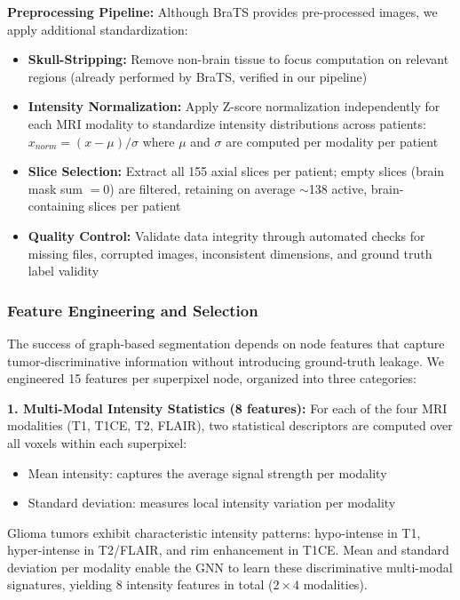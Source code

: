 \textbf{Preprocessing Pipeline:} Although BraTS provides pre-processed images, we apply additional standardization:

\begin{itemize}
    \item \textbf{Skull-Stripping:} Remove non-brain tissue to focus computation on relevant regions (already performed by BraTS, verified in our pipeline)
    
    \item \textbf{Intensity Normalization:} Apply Z-score normalization independently for each MRI modality to standardize intensity distributions across patients: $x_{norm} = (x - \mu) / \sigma$ where $\mu$ and $\sigma$ are computed per modality per patient
    
    \item \textbf{Slice Selection:} Extract all 155 axial slices per patient; empty slices (brain mask sum $= 0$) are filtered, retaining on average $\sim$138 active, brain-containing slices per patient
    
    \item \textbf{Quality Control:} Validate data integrity through automated checks for missing files, corrupted images, inconsistent dimensions, and ground truth label validity
\end{itemize}

\subsubsection{Feature Engineering and Selection}

The success of graph-based segmentation depends on node features that capture tumor-discriminative information without introducing ground-truth leakage. We engineered 15 features per superpixel node, organized into three categories:

\textbf{1. Multi-Modal Intensity Statistics (8 features):} For each of the four MRI modalities (T1, T1CE, T2, FLAIR), two statistical descriptors are computed over all voxels within each superpixel:
\begin{itemize}
    \item Mean intensity: captures the average signal strength per modality
    \item Standard deviation: measures local intensity variation per modality
\end{itemize}

Glioma tumors exhibit characteristic intensity patterns: hypo-intense in T1, hyper-intense in T2/FLAIR, and rim enhancement in T1CE. Mean and standard deviation per modality enable the GNN to learn these discriminative multi-modal signatures, yielding 8 intensity features in total ($2 \times 4$ modalities).

